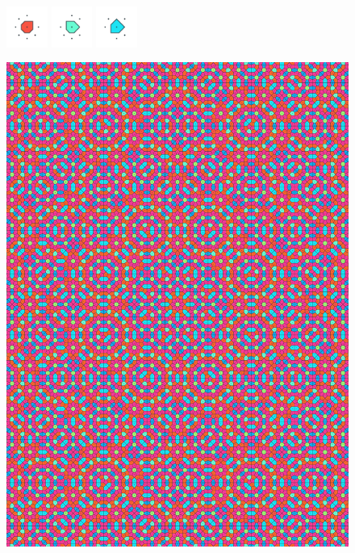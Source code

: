 \documentclass[text.tex]{subfiles}
\begin{document}
\begin{figure}[h!]
\includegraphics[width=0.12\textwidth]{img/results/circle8/circle8_130656_(221_-91alpha_1)_005.pdf}
\includegraphics[width=0.12\textwidth]{img/results/circle8/circle8_130656_(221_-91alpha_1)_006.pdf}
\includegraphics[width=0.12\textwidth]{img/results/circle8/circle8_130656_(221_-91alpha_1)_007.pdf}
\end{figure}

\begin{figure}[h!]
\centering
\includegraphics[width=1\textwidth]{img/results/circle8/quasi_circle_130656_(221_-91alpha_1).pdf}
\end{figure}
\end{document}
